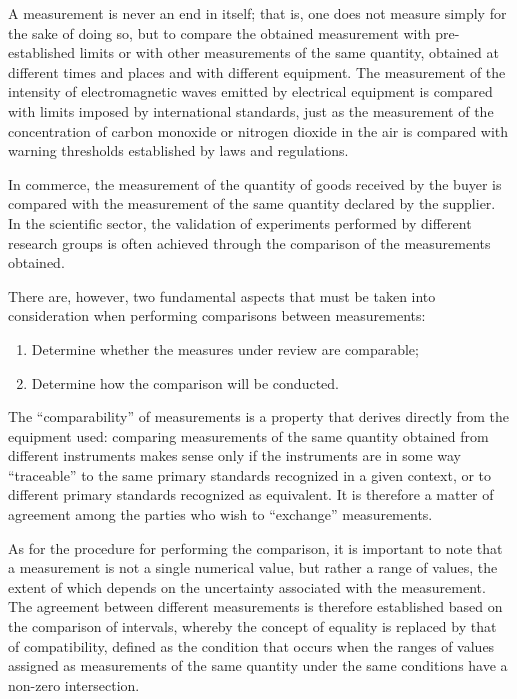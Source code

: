 \documentclass[../main.tex]{subfiles}
\begin{document}
A measurement is never an end in itself; that is, one does not measure simply for the sake of doing so, but to compare the obtained measurement with pre-established limits or with other measurements of the same quantity, obtained at different times and places and with different equipment. The measurement of the intensity of electromagnetic waves emitted by electrical equipment is compared with limits imposed by international standards, just as the measurement of the concentration of carbon monoxide or nitrogen dioxide in the air is compared with warning thresholds established by laws and regulations. 

In commerce, the measurement of the quantity of goods received by the buyer is compared with the measurement of the same quantity declared by the supplier. In the scientific sector, the validation of experiments performed by different research groups is often achieved through the comparison of the measurements obtained. 

There are, however, two fundamental aspects that must be taken into consideration when performing comparisons between measurements:

\begin{enumerate}
	\item[\textbf{-}] Determine whether the measures under review are comparable;
	\item[\textbf{-}] Determine how the comparison will be conducted.
\end{enumerate}


The “comparability” of measurements is a property that derives directly from the equipment used: comparing measurements of the same quantity obtained from different instruments makes sense only if the instruments are in some way “traceable” to the same primary standards recognized in a given context, or to different primary standards recognized as equivalent. It is therefore a matter of agreement among the parties who wish to “exchange” measurements.

As for the procedure for performing the comparison, it is important to note that a measurement is not a single numerical value, but rather a range of values, the extent of which depends on the uncertainty associated with the measurement. The agreement between different measurements is therefore established based on the comparison of intervals, whereby the concept of equality is replaced by that of compatibility,  defined as the condition that occurs when the ranges of values assigned as measurements of the same quantity under the same conditions have a non-zero intersection.
\end{document}
